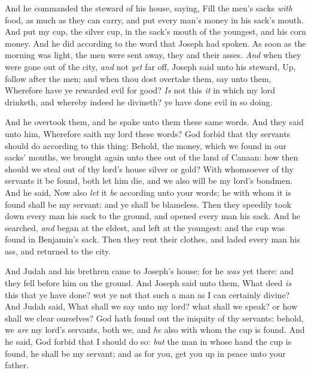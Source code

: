 \documentclass[11pt,letterpaper,oneside]{memoir}
\begin{document}
And he commanded the steward of his house, saying, Fill the men's sacks
\emph{with} food, as much as they can carry, and put every man's money
in his sack's mouth. And put my cup, the silver cup, in the sack's mouth
of the youngest, and his corn money. And he did according to the word
that Joseph had spoken. As soon as the morning was light, the men were
sent away, they and their asses. \emph{And} when they were gone out of
the city, \emph{and} not \emph{yet} far off, Joseph said unto his
steward, Up, follow after the men; and when thou dost overtake them, say
unto them, Wherefore have ye rewarded evil for good? \emph{Is} not this
\emph{it} in which my lord drinketh, and whereby indeed he divineth? ye
have done evil in so doing.

And he overtook them, and he spake unto them these same words. And they
said unto him, Wherefore saith my lord these words? God forbid that thy
servants should do according to this thing: Behold, the money, which we
found in our sacks' mouths, we brought again unto thee out of the land
of Canaan: how then should we steal out of thy lord's house silver or
gold? With whomsoever of thy servants it be found, both let him die, and
we also will be my lord's bondmen. And he said, Now also \emph{let} it
\emph{be} according unto your words; he with whom it is found shall be
my servant; and ye shall be blameless. Then they speedily took down
every man his sack to the ground, and opened every man his sack. And he
searched, \emph{and} began at the eldest, and left at the youngest: and
the cup was found in Benjamin's sack. Then they rent their clothes, and
laded every man his ass, and returned to the city.

And Judah and his brethren came to Joseph's house; for he \emph{was} yet
there: and they fell before him on the ground. And Joseph said unto
them, What deed \emph{is} this that ye have done? wot ye not that such a
man as I can certainly divine? And Judah said, What shall we say unto my
lord? what shall we speak? or how shall we clear ourselves? God hath
found out the iniquity of thy servants: behold, we \emph{are} my lord's
servants, both we, and \emph{he} also with whom the cup is found. And he
said, God forbid that I should do so: \emph{but} the man in whose hand
the cup is found, he shall be my servant; and as for you, get you up in
peace unto your father.
\end{document}
